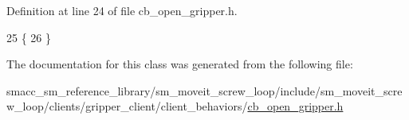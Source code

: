 Definition at line 24 of file cb\+\_\+open\+\_\+gripper.\+h.


\begin{DoxyCode}
25     \{
26     \}
\end{DoxyCode}


The documentation for this class was generated from the following file\+:\begin{DoxyCompactItemize}
\item 
smacc\+\_\+sm\+\_\+reference\+\_\+library/sm\+\_\+moveit\+\_\+screw\+\_\+loop/include/sm\+\_\+moveit\+\_\+screw\+\_\+loop/clients/gripper\+\_\+client/client\+\_\+behaviors/\hyperlink{sm__moveit__screw__loop_2include_2sm__moveit__screw__loop_2clients_2gripper__client_2client__behaviors_2cb__open__gripper_8h}{cb\+\_\+open\+\_\+gripper.\+h}\end{DoxyCompactItemize}
